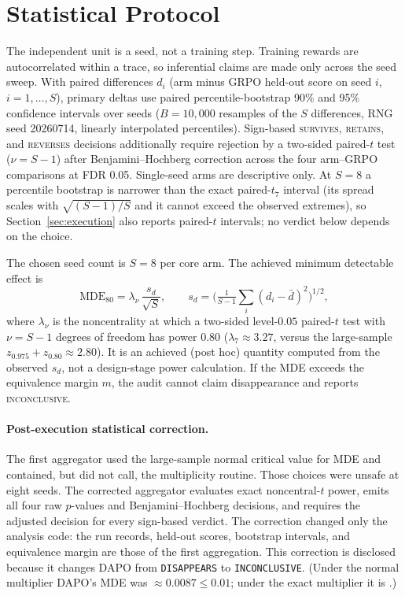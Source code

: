 \documentclass[11pt]{article}
\newcommand{\verdict}[1]{\textsc{#1}}
\begin{document}
\section{Statistical Protocol}
\label{sec:stats}

The independent unit is a seed, not a training step. Training rewards are
autocorrelated within a trace, so inferential claims are made only across the
seed sweep. With paired differences $d_i$ (arm minus GRPO held-out score on
seed $i$, $i=1,\dots,S$), primary deltas use paired percentile-bootstrap 90\%
and 95\% confidence intervals over seeds ($B=10{,}000$ resamples of the $S$
differences, RNG seed 20260714, linearly interpolated percentiles).
Sign-based \verdict{survives}, \verdict{retains}, and \verdict{reverses}
decisions additionally require rejection by a two-sided paired-$t$ test
($\nu=S-1$) after Benjamini--Hochberg correction across the four arm--GRPO
comparisons at FDR 0.05. Single-seed arms are descriptive only. At $S=8$ a
percentile bootstrap is narrower than the exact paired-$t_7$ interval (its
spread scales with $\sqrt{(S-1)/S}$ and it cannot exceed the observed
extremes), so Section~\ref{sec:execution} also reports paired-$t$ intervals;
no verdict below depends on the choice.

The chosen seed count is $S=8$ per core arm. The achieved minimum detectable
effect is
\[
\mathrm{MDE}_{80}=\lambda_{\nu}\,\frac{s_d}{\sqrt S},\qquad
s_d=\Big(\tfrac{1}{S-1}\textstyle\sum_i(d_i-\bar d)^2\Big)^{1/2},
\]
where $\lambda_\nu$ is the noncentrality at which a two-sided level-$0.05$
paired-$t$ test with $\nu=S-1$ degrees of freedom has power 0.80
($\lambda_7\approx3.27$, versus the large-sample $z_{0.975}+z_{0.80}\approx2.80$).
It is an achieved (post hoc) quantity computed from the observed $s_d$, not a
design-stage power calculation. If the MDE exceeds the equivalence margin $m$,
the audit cannot claim disappearance and reports \verdict{inconclusive}.

\paragraph{Post-execution statistical correction.} The first aggregator used
the large-sample normal critical value for MDE and contained, but did not call,
the multiplicity routine. Those choices were unsafe at eight seeds. The
corrected aggregator evaluates exact noncentral-$t$ power, emits all four raw
$p$-values and Benjamini--Hochberg decisions, and requires the adjusted decision
for every sign-based verdict. The correction changed only the analysis code:
the run records, held-out scores, bootstrap intervals, and equivalence margin
are those of the first aggregation. This correction is disclosed
because it changes DAPO from \texttt{DISAPPEARS} to \texttt{INCONCLUSIVE}.
(Under the normal multiplier DAPO's MDE was $\approx0.0087\le0.01$; under the
exact multiplier it is \HistDAPOMDE{}.)
\end{document}
